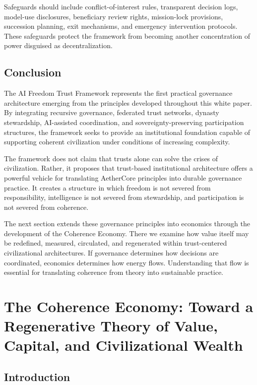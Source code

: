\documentclass[12pt]{article}
\begin{document}
Safeguards should include conflict-of-interest rules, transparent decision logs, model-use disclosures, beneficiary review rights, mission-lock provisions, succession planning, exit mechanisms, and emergency intervention protocols. These safeguards protect the framework from becoming another concentration of power disguised as decentralization.

\subsection{Conclusion}

The AI Freedom Trust Framework represents the first practical governance architecture emerging from the principles developed throughout this white paper. By integrating recursive governance, federated trust networks, dynasty stewardship, AI-assisted coordination, and sovereignty-preserving participation structures, the framework seeks to provide an institutional foundation capable of supporting coherent civilization under conditions of increasing complexity.

The framework does not claim that trusts alone can solve the crises of civilization. Rather, it proposes that trust-based institutional architecture offers a powerful vehicle for translating AetherCore principles into durable governance practice. It creates a structure in which freedom is not severed from responsibility, intelligence is not severed from stewardship, and participation is not severed from coherence.

The next section extends these governance principles into economics through the development of the Coherence Economy. There we examine how value itself may be redefined, measured, circulated, and regenerated within trust-centered civilizational architectures. If governance determines how decisions are coordinated, economics determines how energy flows. Understanding that flow is essential for translating coherence from theory into sustainable practice.

\section{The Coherence Economy: Toward a Regenerative Theory of Value, Capital, and Civilizational Wealth}

\subsection{Introduction}
\end{document}
